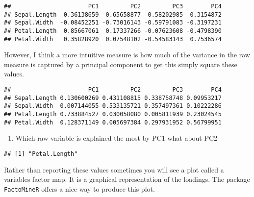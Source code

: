 \documentclass[]{article}
\newenvironment{Shaded}{\begin{snugshade}}{\end{snugshade}}
\newcommand{\DecValTok}[1]{\textcolor[rgb]{0.00,0.00,0.81}{#1}}
\newcommand{\KeywordTok}[1]{\textcolor[rgb]{0.13,0.29,0.53}{\textbf{#1}}}
\newcommand{\NormalTok}[1]{#1}
\newcommand{\OperatorTok}[1]{\textcolor[rgb]{0.81,0.36,0.00}{\textbf{#1}}}
\providecommand{\tightlist}{%
  \setlength{\itemsep}{0pt}\setlength{\parskip}{0pt}}
\begin{document}
\begin{verbatim}
##                      PC1         PC2         PC3        PC4
## Sepal.Length  0.36138659 -0.65658877  0.58202985  0.3154872
## Sepal.Width  -0.08452251 -0.73016143 -0.59791083 -0.3197231
## Petal.Length  0.85667061  0.17337266 -0.07623608 -0.4798390
## Petal.Width   0.35828920  0.07548102 -0.54583143  0.7536574
\end{verbatim}

However, I think a more intuitive measure is how much of the variance in
the raw measure is captured by a principal component to get this simply
square these values.

\begin{Shaded}
\end{Shaded}

\begin{verbatim}
##                      PC1         PC2         PC3        PC4
## Sepal.Length 0.130600269 0.431108815 0.338758748 0.09953217
## Sepal.Width  0.007144055 0.533135721 0.357497361 0.10222286
## Petal.Length 0.733884527 0.030058080 0.005811939 0.23024545
## Petal.Width  0.128371149 0.005697384 0.297931952 0.56799951
\end{verbatim}

\begin{enumerate}
\def\labelenumi{\arabic{enumi})}
\setcounter{enumi}{5}
\tightlist
\item
  Which raw variable is explained the most by PC1 what about PC2
\end{enumerate}

\begin{Shaded}
\end{Shaded}

\begin{verbatim}
## [1] "Petal.Length"
\end{verbatim}

Rather than reporting these values sometimes you will see a plot called
a variables factor map. It is a graphical representation of the
loadings. The package \texttt{FactoMineR} offers a nice way to produce
this plot.
\end{document}
